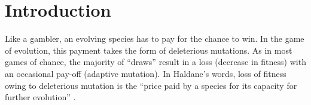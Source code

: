 \documentclass[11pt]{article}
\begin{document}
\begin{abstract}

\end{abstract}
\thispagestyle{empty}

\clearpage

\section*{Introduction}

Like a gambler, an evolving species has to pay for the chance to win.   In the game of evolution, this payment takes the form of deleterious mutations.  As in most games of chance, the majority of ``draws'' result in a loss (decrease in fitness) with an occasional pay-off (adaptive mutation).  In Haldane's words, loss of fitness owing to deleterious mutation is the ``price paid by a species for its capacity for further evolution'' \cite{HALD37}.
\end{document}
